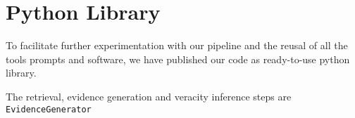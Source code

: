 
\section{Python Library}
\label{sec:software}
To facilitate further experimentation with our pipeline and the reusal of all the tools prompts and software, we have published our code as ready-to-use python library.

The retrieval, evidence generation and veracity inference steps are  \texttt{EvidenceGenerator}